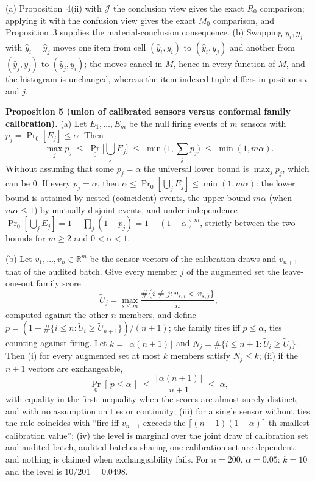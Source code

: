 \documentclass[10pt,journal,compsoc]{IEEEtran}
\begin{document}
\begin{IEEEproof}
(a) Proposition~4(ii) with $\mathcal J$ the conclusion view gives the exact
$R_0$ comparison; applying it with the confusion view gives the exact $M_0$
comparison, and Proposition~3 supplies the material-conclusion consequence.
(b) Swapping $y_i,y_j$ with $\hat y_i=\hat y_j$ moves one item
from cell $(\hat y_i,y_i)$ to $(\hat y_i,y_j)$ and another from
$(\hat y_j,y_j)$ to $(\hat y_j,y_i)$; the moves cancel in $M$, hence in every
function of $M$, and the histogram is unchanged, whereas the item-indexed
tuple differs in positions $i$ and $j$.
\end{IEEEproof}

\textbf{Proposition 5 (union of calibrated sensors versus conformal family
calibration).} (a) Let $E_1,\dots,E_m$ be the null firing events of $m$
sensors with $p_j=\Pr_0[E_j]\le\alpha$. Then
\begin{equation}
\max_j p_j\;\le\;\Pr_0\Big[\bigcup_j E_j\Big]\;\le\;\min\Big(1,\sum_j p_j\Big)\;\le\;\min(1,m\alpha).
\end{equation}
Without assuming that some $p_j=\alpha$ the universal lower bound is
$\max_j p_j$, which can be $0$. If every $p_j=\alpha$, then
$\alpha\le\Pr_0[\bigcup_j E_j]\le\min(1,m\alpha)$: the lower bound is attained
by nested (coincident) events, the upper bound $m\alpha$ (when $m\alpha\le1$) by
mutually disjoint events, and under independence
$\Pr_0[\bigcup_j E_j]=1-\prod_j(1-p_j)=1-(1-\alpha)^m$, strictly between the
two bounds for $m\ge2$ and $0<\alpha<1$.

(b) Let $v_1,\dots,v_n\in\mathbb R^m$ be the sensor vectors of the calibration
draws and $v_{n+1}$ that of the audited batch. Give every member $j$ of the
augmented set the leave-one-out family score
\begin{equation}
\tilde U_j=\max_{s\le m}\frac{\#\{i\ne j: v_{s,i}<v_{s,j}\}}{n},
\end{equation}
computed against the other $n$ members, and define
$p=(1+\#\{i\le n:\tilde U_i\ge\tilde U_{n+1}\})/(n+1)$; the family fires iff
$p\le\alpha$, ties counting against firing. Let $k=\lfloor\alpha(n+1)\rfloor$
and $N_j=\#\{i\le n+1:\tilde U_i\ge\tilde U_j\}$. Then (i) for every
augmented set at most $k$ members satisfy $N_j\le k$; (ii) if the $n+1$
vectors are exchangeable,
\begin{equation}
\Pr_0[\,p\le\alpha\,]\;\le\;\frac{\lfloor\alpha(n+1)\rfloor}{n+1}\;\le\;\alpha,
\end{equation}
with equality in the first inequality when the scores are almost surely
distinct, and with no assumption on ties or continuity; (iii) for a single
sensor without ties the rule coincides with ``fire iff $v_{n+1}$ exceeds the
$\lceil(n+1)(1-\alpha)\rceil$-th smallest calibration value''; (iv) the level
is marginal over the joint draw of calibration set and audited batch, audited
batches sharing one calibration set are dependent, and nothing is claimed
when exchangeability fails. For $n=200$, $\alpha=0.05$: $k=10$ and the level
is $10/201=0.0498$.
\end{document}

